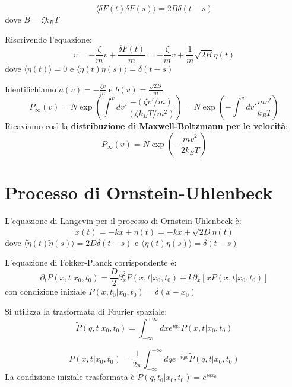 \begin{equation}
\langle \delta F(t) \delta F(s) \rangle = 2B \delta(t-s)
\end{equation}
dove $B = \zeta k_B T$

Riscrivendo l'equazione:
\begin{equation}
\dot{v} = -\frac{\zeta}{m}v + \frac{\delta F(t)}{m} = -\frac{\zeta}{m}v + \frac{1}{m}\sqrt{2B}\eta(t)
\end{equation}
dove $\langle \eta(t) \rangle = 0$ e $\langle \eta(t)\eta(s) \rangle = \delta(t-s)$

Identifichiamo $a(v) = -\frac{\zeta v}{m}$ e $b(v) = \frac{\sqrt{2B}}{m}$
\begin{equation}
P_{\infty}(v) = N \exp\left( \int^v dv' \frac{-(\zeta v'/m)}{(\zeta k_B T / m^2)} \right) = N \exp\left( -\int^v dv' \frac{m v'}{k_B T} \right)
\end{equation}
Ricaviamo così la \textbf{distribuzione di Maxwell-Boltzmann per le velocità}:
\begin{equation}
P_{\infty}(v) = N \exp\left( -\frac{m v^2}{2k_B T} \right) 
\end{equation}
 
 \section{Processo di Ornstein-Uhlenbeck}

L'equazione di Langevin per il processo di Ornstein-Uhlenbeck è:
\begin{equation}
\dot{x}(t) = -kx + \tilde{\eta}(t) = -kx + \sqrt{2D}\eta(t)
\end{equation}
dove $\langle \tilde{\eta}(t)\tilde{\eta}(s) \rangle = 2D\delta(t-s)$ e $\langle \eta(t)\eta(s) \rangle = \delta(t-s)$

L'equazione di Fokker-Planck corrispondente è:
\begin{equation}
\partial_t P(x,t|x_0,t_0) = \frac{D}{2} \partial_x^2 P(x,t|x_0,t_0) + k \partial_x [x P(x,t|x_0,t_0)]
\end{equation}
con condizione iniziale $P(x,t_0|x_0,t_0) = \delta(x-x_0)$

Si utilizza la trasformata di Fourier spaziale:
\begin{equation}
\tilde{P}(q,t|x_0,t_0) = \int_{-\infty}^{+\infty} dx e^{iqx} P(x,t|x_0,t_0)
\end{equation}

\begin{equation}
P(x,t|x_0,t_0) = \frac{1}{2\pi} \int_{-\infty}^{+\infty} dq e^{-iqx} \tilde{P}(q,t|x_0,t_0)
\end{equation}
La condizione iniziale trasformata è $\tilde{P}(q,t_0|x_0,t_0) = e^{iqx_0}$

